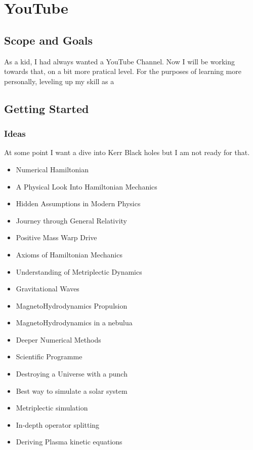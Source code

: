 \chapter{YouTube}

\section{Scope and Goals}

As a kid, I had always wanted a YouTube Channel. Now I will be working towards that, on a bit more pratical level. For the purposes of learning more personally, leveling up my skill as a

\section{Getting Started}

\subsection{Ideas}

At some point I want a dive into Kerr Black holes but I am not ready for that.

\begin{itemize}
  \item Numerical Hamiltonian
  \item A Physical Look Into Hamiltonian Mechanics
  \item Hidden Assumptions in Modern Physics
  \item Journey through General Relativity
  \item Positive Mass Warp Drive
  \item Axioms of Hamiltonian Mechanics
  \item Understanding of Metriplectic Dynamics
  \item Gravitational Waves
  \item MagnetoHydrodynamics Propulsion
  \item MagnetoHydrodynamics in a nebulua
  \item Deeper Numerical Methods
  \item Scientific Programme
  \item Destroying a Universe with a punch
  \item Best way to simulate a solar system
  \item Metriplectic simulation
  \item In-depth operator splitting
  \item Deriving Plasma kinetic equations

\end{itemize}


